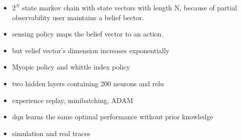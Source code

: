 
\ifdefined\SHOWNOTES
\begin{itemize}
    \item $2^N$ state markov chain with state vectors with length N, because of partial observability \follows user maintains a belief bector.
    \item sensing policy maps the belief vector to an action.
    \item but velief vector's dimension increases exponentially
    \item Myopic policy and whittle index policy
    \item two hidden layers containing 200 neurons and relu
    \item experience replay, minibatching, ADAM
    \item dqn learns the same optimal performance without prior knowledge
    \item simulation and real traces
    \end{itemize}
\fi


